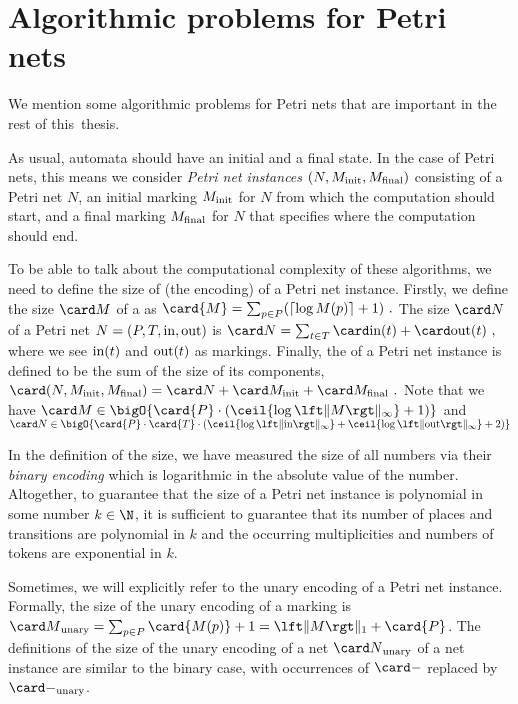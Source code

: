 \documentclass[../../diss.tex]{subfiles}
\begin{document}
\section{Algorithmic problems for Petri nets}

We mention some algorithmic problems for Petri nets that are important in the rest of this~thesis.

As usual, automata should have an initial and a final state.
In the case of Petri nets, this means we consider \emph{Petri net instances} $(N,M_{\text{init}},M_{\text{final}})$ consisting of a Petri net $N$, an initial marking $M_{\text{init}}$ for $N$ from which the computation should start, and a final marking $M_{\text{final}}$ for $N$ that specifies where the computation should end.

To be able to talk about the computational complexity of these algorithms, we need to define the size of (the encoding) of a Petri net instance.
Firstly, we define the size $\size{M}$ of a  as
\(
    \card{M} = \sum_{p \in P} (\lceil \log M(p) \rceil + 1)
    \ .
\)
The size $\size{N}$ of a Petri net $N = (P,T,\text{in},\text{out})$ is
\(
    \size{N} =  \sum_{t \in T} \size{\i(t)} + \size{\o(t)}
    \ ,
\)
where we see $\text{in}(t)$ and $\text{out}(t)$ as markings.
Finally, the  of a Petri net instance is defined to be the sum of the size of its components,
\(
    \size{(N,\Minit,\Mfinal)} = \size{N} + \size{\Minit} + \size{\Mfinal}
    \ .
\)
Note that we have
\(
    \size{M} \in \bigO{ \card{P} \cdot (\ceil{\log \norminf{M}} + 1)  }
\)
and
\(
    \size{N} \in \bigO{ \card{P} \cdot \card{T} \cdot \left( \ceil{ \log \norminf{\i} } + \ceil{ \log \norminf{\o} } + 2  \right) }
\)

In the definition of the size, we have measured the size of all numbers via their \emph{binary encoding} which is logarithmic in the absolute value of the number.
Altogether, to guarantee that the size of a Petri net instance is polynomial in some number $k \in \N$, it is sufficient to guarantee that its number of places and transitions are polynomial in $k$ and the occurring multiplicities and numbers of tokens are exponential in $k$.

Sometimes, we will explicitly refer to the unary encoding of a Petri net instance.
Formally, the size of the unary encoding of a marking is $\sizeunary{M} = \sum_{p \in P} \card{M(p)} + 1 = \normone{M} + \card{P}$.
The definitions of the size of the unary encoding of a net $\sizeunary{N}$ \resp of a net instance are similar to the binary case, with occurrences of $\size{-}$ replaced by $\sizeunary{-}$.
\end{document}
